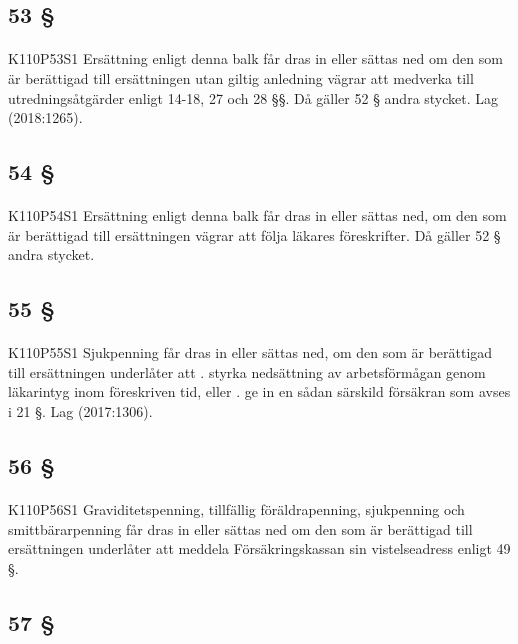 \documentclass[a4paper,notitlepage,openany,10pt]{book}
\begin{document}
\subsection*{53 §}
\paragraph*{}
{\tiny K110P53S1}
Ersättning enligt denna balk får dras in eller sättas ned om den som är berättigad till ersättningen utan giltig anledning vägrar att medverka till utredningsåtgärder enligt 14-18, 27 och 28 §§. Då gäller 52 § andra stycket.
Lag (2018:1265).
\subsection*{54 §}
\paragraph*{}
{\tiny K110P54S1}
Ersättning enligt denna balk får dras in eller sättas ned, om den som är berättigad till ersättningen vägrar att följa läkares föreskrifter. Då gäller 52 § andra stycket.
\subsection*{55 §}
\paragraph*{}
{\tiny K110P55S1}
Sjukpenning får dras in eller sättas ned, om den som är berättigad till ersättningen underlåter att
. styrka nedsättning av arbetsförmågan genom läkarintyg inom föreskriven tid, eller
. ge in en sådan särskild försäkran som avses i 21 §.
Lag (2017:1306).
\subsection*{56 §}
\paragraph*{}
{\tiny K110P56S1}
Graviditetspenning, tillfällig föräldrapenning, sjukpenning och smittbärarpenning får dras in eller sättas ned om den som är berättigad till ersättningen underlåter att meddela Försäkringskassan sin vistelseadress enligt 49 §.
\subsection*{57 §}
\end{document}

